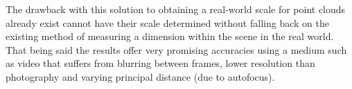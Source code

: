 The drawback with this solution to obtaining a real-world scale for point clouds already exist cannot have their scale determined without falling back on the existing method of measuring a dimension within the scene in the real world. That being said the results offer very promising accuracies using a medium such as video that suffers from blurring between frames, lower resolution than photography and varying principal distance (due to autofocus).